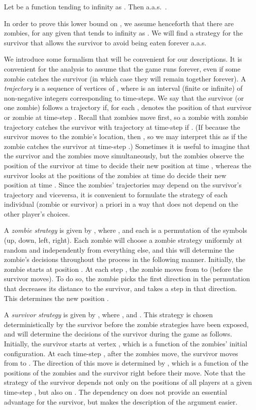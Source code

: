 \documentclass[12pt]{amsart}
\begin{document}
\begin{theorem}\label{thm:torus}
Let  be a function tending to infinity as . Then a.a.s.\ .
\end{theorem}
In order to prove this lower bound on , we assume henceforth that there are  zombies, for any given  that tends to infinity as . We will find a strategy for the survivor
that allows the survivor to avoid being eaten forever a.a.s.

We introduce some formalism that will be convenient for our descriptions.
It is convenient for the analysis to assume that the game runs
forever, even if some zombie catches the survivor (in which case they will remain together forever).
A \emph{trajectory} is a sequence  of vertices of , where  is an interval (finite or
infinite) of non-negative integers corresponding to time-steps. We say that the survivor (or one zombie) follows a trajectory  if, for each ,  denotes the position
of that survivor or zombie at time-step . Recall that zombies move first, so a zombie with zombie trajectory  catches the survivor with trajectory  at time-step  if .
(If  because the survivor moves to the zombie's location, then , so we may interpret this as if the zombie catches the survivor at time-step .)
Sometimes it is useful to imagine that the survivor and the zombies move
simultaneously, but the zombies observe the position of the survivor at time  to decide their new position at time , whereas the survivor looks at the positions of the zombies at time 
do decide their new position at time . Since the zombies' trajectories may depend on the survivor's trajectory and viceversa, it is convenient to formulate the strategy of each individual
(zombie or survivor) a priori in a way that does not depend on the other player's choices.

A \emph{zombie strategy} is given by , where ,  and each  is a permutation of the symbols  (up, down,
left, right). Each zombie will choose a zombie strategy  uniformly at random and independently from everything else, and this will determine the zombie's decisions throughout the
process in the following manner. Initially, the zombie starts at position . At each step , the zombie moves from  to  (before the survivor moves). To do so, the zombie
picks the first direction in the permutation  that decreases its distance to the survivor, and takes a step in that direction. This determines the new position .

A \emph{survivor strategy} is given by , where ,  and .  This strategy
is chosen deterministically by the survivor before the zombie strategies have been exposed, and will determine the decisions of the survivor during the game as follows. Initially, the survivor starts
at vertex , which is a function of the zombies' initial configuration. At each time-step , after the zombies move, the survivor moves from  to . The direction of this move
is determined by , which is a function of the positions of the zombies and the survivor right before their move.
Note that the strategy of the survivor depends not only on the positions of all players at a given time-step , but also on .
The dependency on  does not provide an essential advantage for the survivor, but makes the description of the argument easier.
\end{document}
